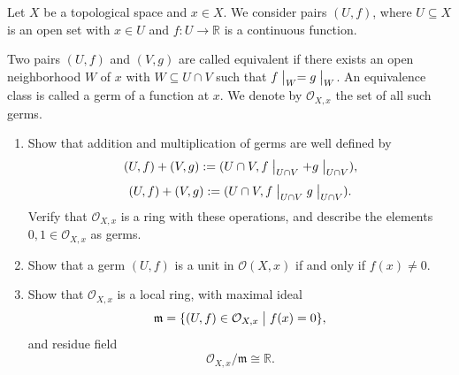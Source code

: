 \documentclass[11pt]{article}
\begin{document}
\begin{prob}
    Let $X$ be a topological space and $x \in X$. 
    We consider pairs $(U,f)$, where $U \subseteq X$ is an open 
    set with $x \in U$ and $f : U \to \mathbb R$ is a 
    continuous function. 

    Two pairs $(U,f)$ and $(V,g)$ are called equivalent if 
    there exists an open neighborhood $W$ of $x$ with 
    $W \subseteq U \cap V$ such that 
    $f\bigm|_W = g\bigm|_W$. An equivalence class is called 
    a germ of a function at $x$. We denote by $\mathcal O_{X,x}$ 
    the set of all such germs. 

    \begin{enumerate}[label=(\alph*)]
        \item Show that addition and multiplication of germs 
            are well defined by 
            \[
                (U,f) + (V,g) 
                := (U \cap V, f\bigm|_{U\cap V} 
                + g\bigm|_{U\cap V}), 
            \]
            \[
                (U,f) + (V,g) 
                := (U \cap V, f\bigm|_{U\cap V} 
                g\bigm|_{U\cap V}). 
            \]
            Verify that $\mathcal O_{X,x}$ is a ring 
            with these operations, and describe the 
            elements $0,1 \in \mathcal O_{X,x}$ as germs. 
        \item Show that a germ $(U,f)$ is a unit in 
            $\mathcal O(X,x)$ if and only if $f(x) \neq 0$. 
        \item Show that $\mathcal O_{X,x}$ is a local ring, 
            with maximal ideal 
            \[
                \mathfrak m = \{(U,f)\in \mathcal O_{X,x} 
                \bigm| f(x) = 0\}, 
            \]
            and residue field 
            \[
                \mathcal O_{X,x}/\mathfrak m \cong \mathbb R.
            \]
    \end{enumerate}
\end{prob}
\end{document}
